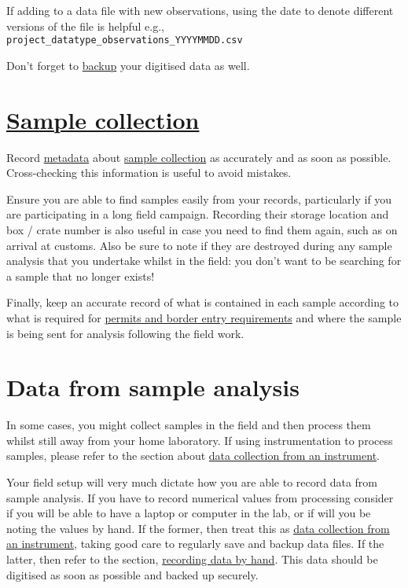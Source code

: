 \documentclass[a4paper,oneside]{report}
\begin{document}
If adding to a data file with new observations, using the date to denote
different versions of the file is helpful e.g.,
\texttt{project\_datatype\_observations\_YYYYMMDD.csv}

Don't forget to \protect\hyperlink{backing-up-data}{backup} your
digitised data as well.

\hypertarget{sample-collection}{%
\section{\texorpdfstring{\protect\hyperlink{collecting-samples}{Sample
collection}}{Sample collection}}\label{sample-collection}}

Record \protect\hyperlink{metadata}{metadata} about
\protect\hyperlink{collecting-samples}{sample collection} as accurately
and as soon as possible. Cross-checking this information is useful to
avoid mistakes.

Ensure you are able to find samples easily from your records,
particularly if you are participating in a long field campaign.
Recording their storage location and box / crate number is also useful
in case you need to find them again, such as on arrival at customs. Also
be sure to note if they are destroyed during any sample analysis that
you undertake whilst in the field: you don't want to be searching for a
sample that no longer exists!

Finally, keep an accurate record of what is contained in each sample
according to what is required for
\protect\hyperlink{travel-and-customs}{permits and border entry
requirements} and where the sample is being sent for analysis following
the field work.

\hypertarget{data-from-sample-analysis}{%
\section{Data from sample analysis}\label{data-from-sample-analysis}}

In some cases, you might collect samples in the field and then process
them whilst still away from your home laboratory. If using
instrumentation to process samples, please refer to the section about
\protect\hyperlink{data-collection-from-an-instrument}{data collection
from an instrument}.

Your field setup will very much dictate how you are able to record data
from sample analysis. If you have to record numerical values from
processing consider if you will be able to have a laptop or computer in
the lab, or if will you be noting the values by hand. If the former,
then treat this as
\protect\hyperlink{data-collection-from-an-instrument}{data collection
from an instrument}, taking good care to regularly save and backup data
files. If the latter, then refer to the section,
\protect\hyperlink{recording-data-by-hand}{recording data by hand}. This
data should be digitised as soon as possible and backed up securely.
\end{document}
